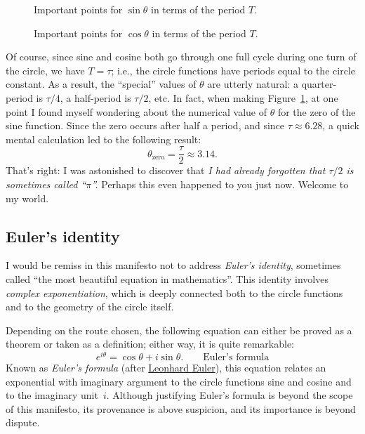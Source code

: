 \begin{figure}
\begin{center}
\end{center}
\caption{Important points for $\sin\theta$ in terms of the period $T$.\label{fig:sine_with_tau}}
\end{figure}

\begin{figure}
\begin{center}
\end{center}
\caption{Important points for $\cos\theta$ in terms of the period $T$.\label{fig:cosine_with_tau}}
\end{figure}

Of course, since sine and cosine both go through one full cycle during one turn of the circle, we have $T = \tau$; i.e., the circle functions have periods equal to the circle constant. As a result, the ``special'' values of $\theta$ are utterly natural: a quarter-period is $\tau/4$, a half-period is $\tau/2$, etc. In fact, when making Figure~\ref{fig:sine_with_tau}, at one point I found myself wondering about the numerical value of $\theta$ for the zero of the sine function. Since the zero occurs after half a period, and since $\tau \approx 6.28$, a quick mental calculation led to the following result:
\[
  \theta_\mathrm{zero} = \frac{\tau}{2} \approx 3.14.
\]
 That's right: I was astonished to discover that \emph{I had already forgotten that $\tau/2$ is sometimes called ``$\pi$''.} Perhaps this even happened to you just now. Welcome to my world.



   \subsection{Euler's identity} %
   \label{sec:euler_s_identity}

I would be remiss in this manifesto not to address \emph{Euler's identity}, sometimes called ``the most beautiful equation in mathematics''. This identity involves \emph{complex exponentiation}, which is deeply connected both to the circle functions and to the geometry of the circle itself.

Depending on the route chosen, the following equation can either be proved as a theorem or taken as a definition; either way, it is quite remarkable:
\[ e^{i\theta} = \cos\theta + i\sin\theta. \qquad\mbox{Euler's formula} \]
Known as \emph{Euler's formula} (after \href{http://en.wikipedia.org/wiki/Leonhard_Euler}{Leonhard Euler}), this equation relates an exponential with imaginary argument to the circle functions sine and cosine and to the imaginary unit~$i$. Although justifying Euler's formula is beyond the scope of this manifesto, its provenance is above suspicion, and its importance is beyond dispute.

